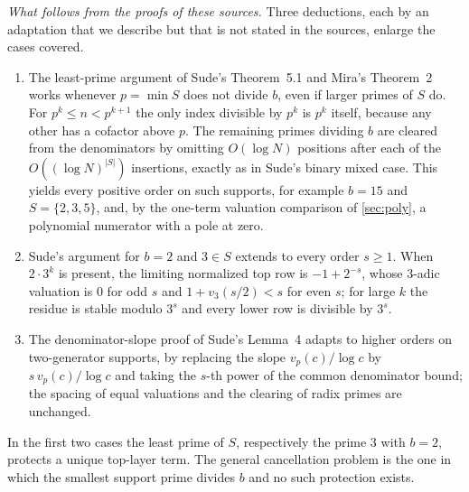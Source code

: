 \documentclass[11pt]{article}
\begin{document}
\emph{What follows from the proofs of these sources.} Three deductions, each by an adaptation that we describe but that is not stated in the sources, enlarge the cases covered.
\begin{enumerate}[label=\textup{(\arabic*)},leftmargin=2em]
\item The least-prime argument of Sude's Theorem~5.1 and Mira's Theorem~2 works whenever $p=\min S$ does not divide $b$, even if larger primes of $S$ do. For $p^k\le n<p^{k+1}$ the only index divisible by $p^k$ is $p^k$ itself, because any other has a cofactor above $p$. The remaining primes dividing $b$ are cleared from the denominators by omitting $O(\log N)$ positions after each of the $O((\log N)^{|S|})$ insertions, exactly as in Sude's binary mixed case. This yields every positive order on such supports, for example $b=15$ and $S=\{2,3,5\}$, and, by the one-term valuation comparison of \cref{sec:poly}, a polynomial numerator with a pole at zero.
\item Sude's argument for $b=2$ and $3\in S$ extends to every order $s\ge1$. When $2\cdot3^k$ is present, the limiting normalized top row is $-1+2^{-s}$, whose $3$-adic valuation is $0$ for odd $s$ and $1+v_3(s/2)<s$ for even $s$; for large $k$ the residue is stable modulo $3^s$ and every lower row is divisible by $3^s$.
\item The denominator-slope proof of Sude's Lemma~4 adapts to higher orders on two-generator supports, by replacing the slope $v_p(c)/\log c$ by $s\,v_p(c)/\log c$ and taking the $s$-th power of the common denominator bound; the spacing of equal valuations and the clearing of radix primes are unchanged.
\end{enumerate}
In the first two cases the least prime of $S$, respectively the prime $3$ with $b=2$, protects a unique top-layer term. The general cancellation problem is the one in which the smallest support prime divides $b$ and no such protection exists.
\end{document}
